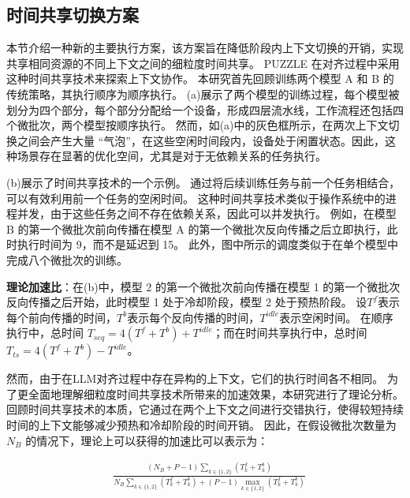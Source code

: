 \subsection{时间共享切换方案}
本节介绍一种新的主要执行方案，该方案旨在降低阶段内上下文切换的开销，实现共享相同资源的不同上下文之间的细粒度时间共享。
PUZZLE 在对齐过程中采用这种时间共享技术来探索上下文协作。 
本研究首先回顾训练两个模型 A 和 B 的传统策略，其执行顺序为顺序执行。
(a)展示了两个模型的训练过程，每个模型被划分为四个部分，每个部分分配给一个设备，形成四层流水线，工作流程还包括四个微批次，两个模型按顺序执行。
然而，如(a)中的灰色框所示，在两次上下文切换之间会产生大量 “气泡”，在这些空闲时间段内，设备处于闲置状态。因此，这种场景存在显著的优化空间，尤其是对于无依赖关系的任务执行。 

(b)展示了时间共享技术的一个示例。
通过将后续训练任务与前一个任务相结合，可以有效利用前一个任务的空闲时间。
这种时间共享技术类似于操作系统中的进程并发，由于这些任务之间不存在依赖关系，因此可以并发执行。
例如，在模型 B 的第一个微批次前向传播在模型 A 的第一个微批次反向传播之后立即执行，此时执行时间为 9，而不是延迟到 15。
此外，图中所示的调度类似于在单个模型中完成八个微批次的训练。 

\textbf{理论加速比}：在(b)中，模型 2 的第一个微批次前向传播在模型 1 的第一个微批次反向传播之后开始，此时模型 1 处于冷却阶段，模型 2 处于预热阶段。
设\(T^{f}\)表示每个前向传播的时间，\(T^{b}\)表示每个反向传播的时间，\(T^{idle}\)表示空闲时间。
在顺序执行中，总时间 \(T_{seq} = 4(T^{f} + T^{b}) + T^{idle}\)；而在时间共享执行中，总时间 \(T_{ts} = 4(T^{f} + T^{b}) - T^{idle}\)。



然而，由于在LLM对齐过程中存在异构的上下文，它们的执行时间各不相同。
为了更全面地理解细粒度时间共享技术所带来的加速效果，本研究进行了理论分析。
回顾时间共享技术的本质，它通过在两个上下文之间进行交错执行，使得较短持续时间的上下文能够减少预热和冷却阶段的时间开销。
因此，在假设微批次数量为 $N_B$ 的情况下，理论上可以获得的加速比可以表示为：


\begin{equation}
\begin{split}
\label{equation:theoretical-speedup}
&\frac{(N_{B}+P-1)\sum_{k\in\{1,2\}}(T^f_k+T^b_k)}{N_{B}\sum_{k\in\{1,2\}}(T^f_k+T^b_k)+(P-1)\max\limits_{k\in\{1,2\}}{(T^f_k+T^b_k)}}
\end{split}
\end{equation}

